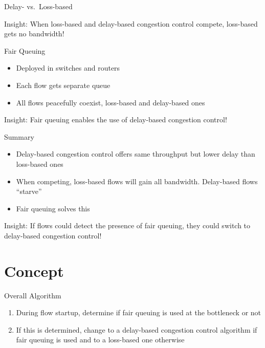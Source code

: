 \documentclass[xcolor={dvipsnames}]{beamer}
\begin{document}
\begin{frame}{Delay- vs.~Loss-based}
\begin{block}{Insight:}
When loss-based and delay-based congestion control compete, loss-based gets no bandwidth!\end{block}
\end{frame}

\begin{frame}{Fair Queuing}
\begin{itemize}
\item Deployed in switches and routers
\item Each flow gets separate queue
\item All flows peacefully coexist, loss-based and delay-based ones
\end{itemize}
\begin{block}{Insight:}
Fair queuing enables the use of delay-based congestion control!
\end{block}
\end{frame}

\begin{frame}{Summary}
\begin{itemize}
\item Delay-based congestion control offers same throughput but lower delay than loss-based ones
\item When competing, loss-based flows will gain all bandwidth. Delay-based flows ``starve''
\item Fair queuing solves this
\end{itemize}
\begin{block}{Insight:}
If flows could detect the presence of fair queuing, they could switch to delay-based congestion control!
\end{block}
\end{frame}

\section{Concept}
\begin{frame}{Overall Algorithm}
\begin{enumerate}
\item During flow startup, determine if fair queuing is used at the bottleneck or not
\item If this is determined, change to a delay-based congestion control algorithm if fair queuing is used and to a loss-based one otherwise
\end{enumerate}
\end{frame}
\end{document}
